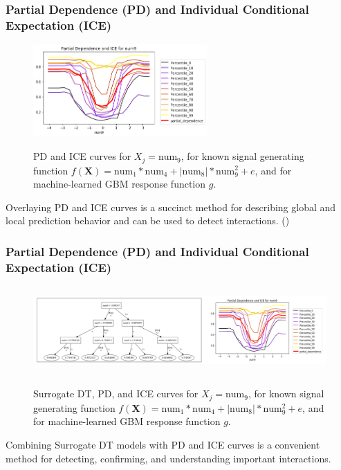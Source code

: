 \documentclass[11pt,
               aspectratio=169
               ]{beamer}
\begin{document}
		\begin{frame}[t]
		
			\frametitle{Partial Dependence (PD) and Individual Conditional Expectation (ICE)}
		
			\begin{figure}[htb]
				\begin{center}
					\includegraphics[height=100pt]{img/pdp_ice.png}
					\label{fig:pdp_ice}
					\caption{PD and ICE curves for $ X_j = \text{num}_9$, for known signal generating function $f(\mathbf{X}) = \text{num} _1 * \text{num}_4 + |\text{num}_8| * \text{num}_9^2 + e$, and for machine-learned GBM response function $g$.}
				\end{center}
			\end{figure}
			
			\vspace{-10pt}
			
			Overlaying PD and ICE curves is a succinct method for describing global and local prediction behavior and can be used to detect interactions. (\cite{ice_plots}) 
			
		\end{frame}
	
		\begin{frame}[t]
	
			\frametitle{Partial Dependence (PD) and Individual Conditional Expectation (ICE)}
			
			\vspace{-20pt}
				
				\begin{figure}[htb]
					\begin{center}
						\label{fig:dt_surrogate_pdp_ice}
						\includegraphics[height=95pt]{img/dt_surrogate2_pdp_ice2.png}
						\caption{Surrogate DT, PD, and ICE curves for $ X_j = \text{num}_9$, for known signal generating function $f(\mathbf{X}) = \text{num} _1 * \text{num}_4 + |\text{num}_8| * \text{num}_9^2 + e$, and for machine-learned GBM response function $g$.}
					\end{center}
				\end{figure}
			
				Combining Surrogate DT models with PD and ICE curves is a convenient method for detecting, confirming, and understanding important interactions. 
	
		\end{frame}
\end{document}
